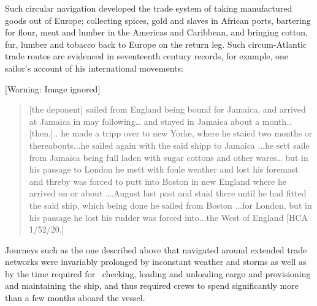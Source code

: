\begin{styleStandard}
Such circular navigation developed the trade system of taking manufactured goods out of Europe; collecting spices, gold and slaves in African ports, bartering for flour, meat and lumber in the Americas and Caribbean, and bringing cotton, fur, lumber and tobacco back to Europe on the return leg. Such circum-Atlantic trade routes are evidenced in seventeenth century records, for example, one sailor’s account of his international movements:
\end{styleStandard}


\begin{center}
 [Warning: Image ignored] %

\end{center}
\begin{quotation}
[the deponent] sailed from England being bound for Jamaica, and arrived at Jamaica in may following… and stayed in Jamaica about a month…[then.].. he made a tripp over to new Yorke, where he staied two months or thereabouts...he sailed again with the said shipp to Jamaica ...he sett saile from Jamaica being full laden with sugar cottons and other wares… but in his passage to London he mett with foule weather and lost his foremast and threby was forced to putt into Boston in new England where he arrived on or about ….August last past and staid there until he had fitted the said ship, which being done he sailed from Boston ...for London, but in his passage he lost his rudder was forced into...the West of England [HCA 1/52/20.]

\end{quotation}
\begin{styleStandard}
Journeys such as the one described above that navigated around extended trade networks were invariably prolonged by inconstant weather and storms as well as by the time required for \ checking, loading and unloading cargo and provisioning and maintaining the ship, and thus required crews to spend significantly more than a few months aboard the vessel. 
\end{styleStandard}



